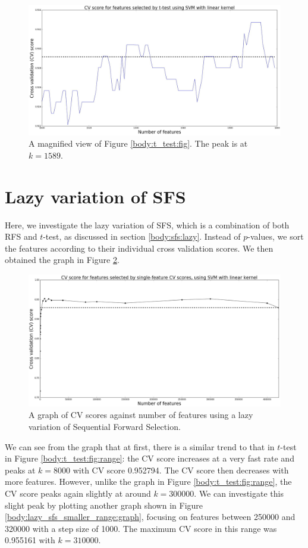 \documentclass[12pt, twoside, a4paper]{report}
\begin{document}
\begin{figure}
\centering
\includegraphics[width=\textwidth]{images/t_test_2000_uneq_var_zoom.jpeg}
\caption{A magnified view of Figure \ref{body:t_test:fig}. The peak is at $k=1589$.}
\label{body:t_test:fig_zoom}
\end{figure}

\section{Lazy variation of SFS}
Here, we investigate the lazy variation of SFS, which is a combination of both RFS and $t$-test, as discussed in section \ref{body:sfs:lazy}. Instead of $p$-values, we sort the features according to their individual cross validation scores. We then obtained the graph in Figure \ref{body:lazy_sfs:graph}. 

\begin{figure}
\centering
\includegraphics[width=\textwidth]{images/lazy_sfs_range.jpeg}
\caption{A graph of CV scores against number of features using a lazy variation of Sequential Forward Selection.}
\label{body:lazy_sfs:graph}
\end{figure}

We can see from the graph that at first, there is a similar trend to that in $t$-test in Figure \ref{body:t_test:fig:range}: the CV score increases at a very fast rate and peaks at $k=8000$ with CV score 0.952794.  The CV score then decreases with more features. However, unlike the graph in Figure \ref{body:t_test:fig:range}, the CV score peaks again slightly at around $k=300000$. We can investigate this slight peak by plotting another graph shown in Figure \ref{body:lazy_sfs_smaller_range:graph}, focusing on features between 250000 and 320000 with a step size of 1000. The maximum CV score in this range was 0.955161 with $k=310000$.
\end{document}
